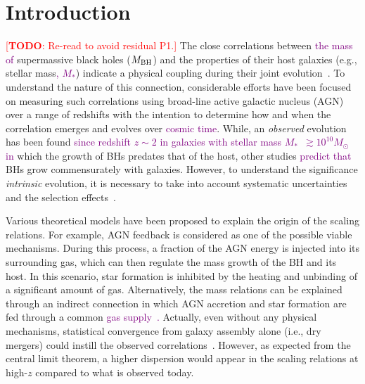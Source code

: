 \documentclass[twocolumn]{aastex631}
\newcommand{\todo}[1]{\textcolor{red}{[{\bf TODO}: #1]}}
\newcommand{\red}[1]{\textcolor{purple}{#1}}
\def\smass{{$M_*$}}
\def\mbh{$M_{\rm BH}$}
\begin{document}
\section{Introduction} \label{sec:intro}
\todo{Re-read to avoid residual P1.}
The close correlations between \red{the mass of} supermassive black holes (\red{\mbh}) and the properties of their host galaxies (e.g., stellar mass\red{, \smass}) indicate a physical coupling during their joint evolution~\citep{Mag++98, F+M00, M+H03, H+R04, Gul++09}. To understand the nature of this connection, considerable efforts have been focused on measuring such correlations using broad-line active galactic nucleus (AGN) over a range of redshifts with the intention to determine how and when the correlation emerges and evolves over \red{cosmic time}. While, an {\it observed} evolution has been found \red{since redshift $z\sim2$ in galaxies with stellar mass \smass\ $\gtrsim 10^{10}M_{\odot}$ \citep[e.g.,][]{Tre++04, Peng2006a,Tre++07,Woo++08,Bennert11,Park15, Ding2020, 2021arXiv210902751L} in} which the growth of BHs predates that of the host, other studies \red{predict \citep[e.g.,][]{Schramm2013, Sun2015} that} BHs grow commensurately with galaxies.
However, to understand the significance {\it intrinsic} evolution, it is necessary to take into account systematic uncertainties and the selection effects~\citep{Tre++07, Lauer2007, Schulze2014, Park15,Jahnke2009}. 

Various theoretical models have been proposed to explain the origin of the scaling relations. For example, AGN feedback is considered as one of the possible viable mechanisms. During this process, a fraction of the AGN energy is injected into its surrounding gas, which can then regulate the mass growth of the BH and its host. In this scenario, star formation is inhibited by the heating and unbinding of a significant amount of gas. Alternatively, the mass relations can be explained through an indirect connection in which AGN accretion and star formation are fed through a common \red{gas supply~\citep{Cen2015, Menci2016, angles_black_2017}. }Actually, even without any physical mechanisms, statistical convergence from galaxy assembly alone (i.e., dry mergers) could instill the observed correlations~\citep{Peng2007, Jahnke2011, Hirschmann2010}. However, as expected from the central limit theorem, a higher dispersion would appear in the scaling relations at high-$z$ compared to what is observed today. 
\end{document}
